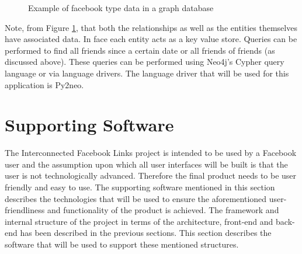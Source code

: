 \documentclass[10pt,onecolumn]{article}
\begin{document}
\begin{figure}[htbp]
    \centering
    \caption{Example of facebook type data in a graph database}
    \label{friends}
\end{figure}
Note, from Figure \ref{friends}, that both the relationships as well as the entities themselves have associated data. In face each entity acts as a key value store. Queries can be performed to find all friends since a certain date or all friends of friends (as discussed above). These queries can be performed using Neo4j's Cypher query language or via language drivers. The language driver that will be used for this application is Py2neo.

\section{Supporting Software}
The Interconnected Facebook Links project is intended to be used by a Facebook user and the assumption upon which all user interfaces will be built is that the user is not technologically advanced. Therefore the final product needs to be user friendly and easy to use. The supporting software mentioned in this section describes the technologies that will be used to ensure the aforementioned user-friendliness and functionality of the product is achieved. The framework and internal structure  of the project in terms of the architecture, front-end and back-end has been described in the previous sections. This section describes the software that will be used to support these mentioned structures.
\end{document}
